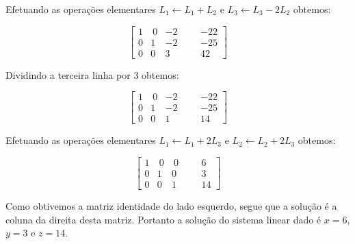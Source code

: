\begin{solution}
Efetuando as operações elementares $L_1 \leftarrow L_1 + L_2$ e $L_3 \leftarrow L_3 - 2L_2$ obtemos:

$$ \left[\begin{array}{rrrr|rr}
	1 & \  0 &  -2 & & &  -22  \\
	0 &    1 &  -2 & & &  -25  \\ 
	0 &    0 &   3 & & &   42  \end{array}\right] $$

Dividindo a terceira linha por 3 obtemos:


$$ \left[\begin{array}{rrrr|rr}
	1 & \  0 &  -2 & & &  -22  \\
	0 &    1 &  -2 & & &  -25  \\ 
	0 &    0 &   1 & & &   14  \end{array}\right] $$

Efetuando as operações elementares $L_1 \leftarrow L_1 + 2L_3$ e $L_2 \leftarrow L_2 + 2L_3$ obtemos:

$$ \left[\begin{array}{rrrr|rr}
	1 & \  0 & \  0 & & &    6  \\
	0 &    1 &    0 & & &    3  \\ 
	0 &    0 &    1 & & &   14  \end{array}\right] $$

Como obtivemos a matriz identidade do lado esquerdo, segue que a solução é a coluna da direita desta matriz. 
Portanto a solução do sistema linear dado é $x=6$, $y=3$ e $z=14$.
\end{solution}

